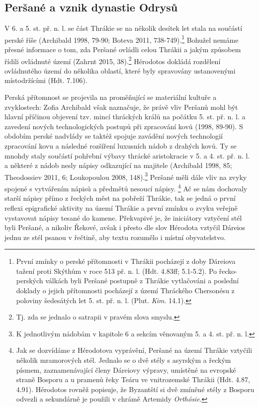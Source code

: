 
\subsection[peršané-a-vznik-dynastie-odrysů]{Peršané a vznik dynastie Odrysů}

V 6. a 5. st. př. n. l. se část Thrákie se na několik desítek let stala na součástí perské říše (Archibald 1998, 79-90; Boteva 2011, 738-749).\footnote{První zmínky o perské přítomnosti v Thrákii pocházejí z doby Dáreiova tažení proti Skýthům v roce 513 př. n. l. (Hdt. 4.83ff; 5.1-5.2). Po řecko-perských válkách byli Peršané postupně z Thrákie vytlačováni a poslední doklady o jejich přítomnosti pocházejí z území Thráckého Chersonésu z poloviny šedesátých let 5. st. př. n. l. (Plut. {\em Kim}. 14.1).} Bohužel nemáme přesné informace o tom, zda Peršané ovládli celou Thrákii a jakým způsobem řídili ovládnuté území (Zahrnt 2015, 38).\footnote{Tj. zda se jednalo o satrapii v pravém slova smyslu.} Hérodotos dokládá rozdělení ovládnutého území do několika oblastí, které byly spravovány ustanovenými místodržícími (Hdt. 7.106).

Perská přítomnost se projevila na proměňující se materiální kultuře a zvyklostech: Zofia Archibald však naznačuje, že právě vliv Peršanů mohl být hlavní příčinou objevení tzv. mincí thráckých králů na počátku 5. st. př. n. l. a zavedení nových technologických postupů při zpracování kovů (1998, 89-90). S obdobím perské nadvlády se taktéž spojuje zavádění nových technologií zpracování kovu a následné rozšíření luxusních nádob z drahých kovů. Ty se mnohdy staly součástí pohřební výbavy thrácké aristokracie v 5. a 4. st. př. n. l. a některé z nádob nesly nápisy odkazující na majitele (Archibald 1998, 85; Theodossiev 2011, 6; Loukopoulou 2008, 148).\footnote{K jednotlivým nádobám v kapitole 6 a sekcím věnovaným 5. a 4. st. př. n. l.} Peršané měli dále vliv na zvyky spojené s vytvářením nápisů a předmětů nesoucí nápisy. \footnote{Jak se dozvídáme z Hérodotova vyprávění, Peršané na území Thrákie vztyčili několik mramorových stél. Jednalo se o dvě stély s asyrským a řeckým písmem, zaznamenávající členy Dáreiovy výpravy, umístěné na evropské straně Bosporu a u pramenů řeky Teáru ve vnitrozemské Thrákii (Hdt. 4.87, 4.91). Hérodotos rovněž popisuje, že Byzantští si dvě zmíněné stély z Bosporu odvezli a sekundárně je použili v chrámě Artemidy {\em Orthósie}.} Ač se nám dochovaly starší nápisy přímo z řeckých měst na pobřeží Thrákie, tak se jedná o první reflexi epigrafické aktivity na území Thrákie a první zmínku o zvyku veřejně vystavovat nápisy tesané do kamene. Překvapivé je, že iniciátory vztyčení stél byli Peršané, a nikoliv Řekové, avšak i přesto dle slov Hérodota vztyčil Dáreios jednu ze stél psanou v řečtině, aby textu rozumělo i místní obyvatelstvo.

